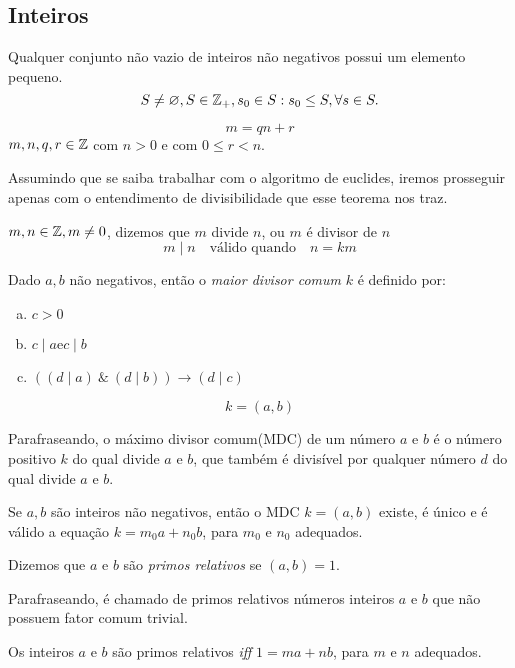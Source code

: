 \subsection{Inteiros}
\begin{definition}\label{PBO}
    Qualquer conjunto não vazio de inteiros não negativos possui um elemento pequeno.
    $$S\neq \varnothing, S \in \mathbb{Z}_+, s_{0} \in S: s_{0} \leq S, \forall s \in S.$$
\end{definition}
\begin{theorem}
    $$m = qn + r$$
    $m, n, q, r \in \mathbb{Z}$ com $n > 0$ e com $0 \leq r < n$.
\end{theorem}
Assumindo que se saiba trabalhar com o algoritmo de euclides, iremos prosseguir apenas com o entendimento de divisibilidade que esse teorema nos traz.
\begin{definition}
    $m, n \in \mathbb{Z}, m \neq 0$, dizemos que $m$ divide $n$, ou $m$ é divisor de $n$ $$m \mid n\quad \textrm{válido quando}\quad n = km$$
\end{definition} 
\begin{definition}
    Dado $a,b$ não negativos, então o \textit{maior divisor comum} $k$ é definido por: 
    \begin{enumerate}[(a)]
        \item $c>0$
        \item $c\mid a$\quad e\quad $c\mid b$
        \item $((d \mid a)\ \&\ (d\mid b)) \rightarrow (d\mid c)$
    \end{enumerate}
    $$k = (a,b)$$
\end{definition}
Parafraseando, o máximo divisor comum(MDC) de um número $a$ e $b$ é o número positivo $k$ do qual divide $a$ e $b$, que também é divisível por qualquer número $d$ do qual divide $a$ e $b$.
\begin{theorem}
    Se $a,b$ são inteiros não negativos, então o MDC $k = (a,b)$ existe, é único e é válido a equação $k = m_{0}a + n_{0}b$, para $m_{0}$ e $n_{0}$ adequados.
\end{theorem}
\begin{definition}
    Dizemos que $a$ e $b$ são \textit{primos relativos} se $(a,b)=1$.
\end{definition}
Parafraseando, é chamado de primos relativos números inteiros $a$ e $b$ que não possuem fator comum trivial.
\begin{corollary}\label{C1}
    Os inteiros $a$ e $b$ são primos relativos \textit{iff} $1 = ma + nb$, para $m$ e $n$ adequados.
\end{corollary}
